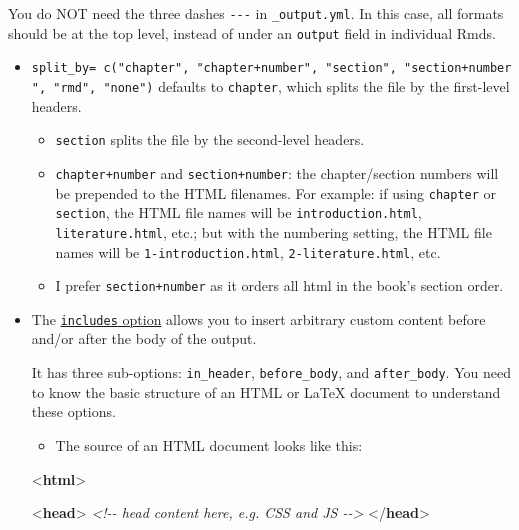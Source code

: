 \documentclass[
  a4paper,
  twoside,
  openright]{book}
\newenvironment{Shaded}{\begin{snugshade}}{\end{snugshade}}
\newcommand{\CommentTok}[1]{\textcolor[rgb]{0.56,0.35,0.01}{\textit{#1}}}
\newcommand{\DataTypeTok}[1]{\textcolor[rgb]{0.13,0.29,0.53}{#1}}
\newcommand{\KeywordTok}[1]{\textcolor[rgb]{0.13,0.29,0.53}{\textbf{#1}}}
\providecommand{\tightlist}{%
  \setlength{\itemsep}{0pt}\setlength{\parskip}{0pt}}
\theoremstyle{definition}
\theoremstyle{definition}
\theoremstyle{definition}
\theoremstyle{definition}
\theoremstyle{remark}
\begin{document}
You do NOT need the three dashes \texttt{-\/-\/-} in \texttt{\_output.yml}. In this case, all formats should be at the top level, instead of under an \texttt{output} field in individual Rmds.

\begin{itemize}
\item
  \texttt{split\_by=\ c("chapter",\ "chapter+number",\ "section",\ "section+number",\ "rmd",\ "none")} defaults to \texttt{chapter}, which splits the file by the first-level headers.

  \begin{itemize}
  \tightlist
  \item
    \texttt{section} splits the file by the second-level headers.
  \item
    \texttt{chapter+number} and \texttt{section+number}: the chapter/section numbers will be prepended to the HTML filenames. For example: if using \texttt{chapter} or \texttt{section}, the HTML file names will be \texttt{introduction.html}, \texttt{literature.html}, etc.; but with the numbering setting, the HTML file names will be \texttt{1-introduction.html}, \texttt{2-literature.html}, etc.
  \item
    I prefer \texttt{section+number} as it orders all html in the book's section order.
  \end{itemize}
\item
  The \href{https://bookdown.org/yihui/bookdown/yaml-options.html}{\texttt{includes} option} allows you to insert arbitrary custom content before and/or after the body of the output.

  It has three sub-options: \texttt{in\_header}, \texttt{before\_body}, and \texttt{after\_body}. You need to know the basic structure of an HTML or LaTeX document to understand these options.

  \begin{itemize}
  \tightlist
  \item
    The source of an HTML document looks like this:
  \end{itemize}

\begin{Shaded}
\begin{Highlighting}[]
\DataTypeTok{\textless{}}\KeywordTok{html}\DataTypeTok{\textgreater{}}

  \DataTypeTok{\textless{}}\KeywordTok{head}\DataTypeTok{\textgreater{}}
  \CommentTok{\textless{}!{-}{-} head content here, e.g. CSS and JS {-}{-}\textgreater{}}
  \DataTypeTok{\textless{}/}\KeywordTok{head}\DataTypeTok{\textgreater{}}


\end{Highlighting}
\end{Shaded}
\end{itemize}
\end{document}
